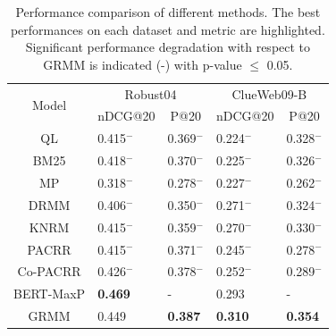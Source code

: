 \label{sec:modelcompare}
\begin{table}[]
	\fontsize{9.3pt}{11pt}\selectfont
    \begin{tabular}{@{}cllll@{}}
    \toprule
    \multirow{2}{*}{Model} & \multicolumn{2}{c}{Robust04}                           & \multicolumn{2}{c}{ClueWeb09-B}                        \\ \cmidrule(l){2-5} 
                           & \multicolumn{1}{c}{nDCG@20} & \multicolumn{1}{c}{P@20} & \multicolumn{1}{c}{nDCG@20} & \multicolumn{1}{c}{P@20} \\ \midrule
    QL                     & 0.415$^-$                   & 0.369$^-$                & 0.224$^-$                   & 0.328$^-$                \\
    BM25                   & 0.418$^-$                   & 0.370$^-$                & 0.225$^-$                   & 0.326$^-$                \\ \midrule
    MP                     & 0.318$^-$                   & 0.278$^-$                & 0.227$^-$                   & 0.262$^-$                \\
    DRMM                   & 0.406$^-$                   & 0.350$^-$                & 0.271$^-$                   & 0.324$^-$                \\
    KNRM                   & 0.415$^-$                   & 0.359$^-$                & 0.270$^-$                   & 0.330$^-$                \\
    PACRR                  & 0.415$^-$                   & 0.371$^-$                & 0.245$^-$                   & 0.278$^-$                \\
    Co-PACRR               & 0.426$^-$                   & 0.378$^-$                & 0.252$^-$                   & 0.289$^-$                \\ \midrule
    BERT-MaxP              & \textbf{0.469}                       & -                        & 0.293                       & -                        \\ \midrule
    GRMM                   & 0.449                        & \textbf{0.387}                    & \textbf{0.310}                       & \textbf{0.354}                    \\ \bottomrule
    \end{tabular}
	\caption{Performance comparison of different methods. The best performances on each dataset and metric are highlighted. Significant performance degradation with respect to GRMM is indicated (-) with p-value $\leq$ 0.05.}
	\label{tab:2}
\end{table}

